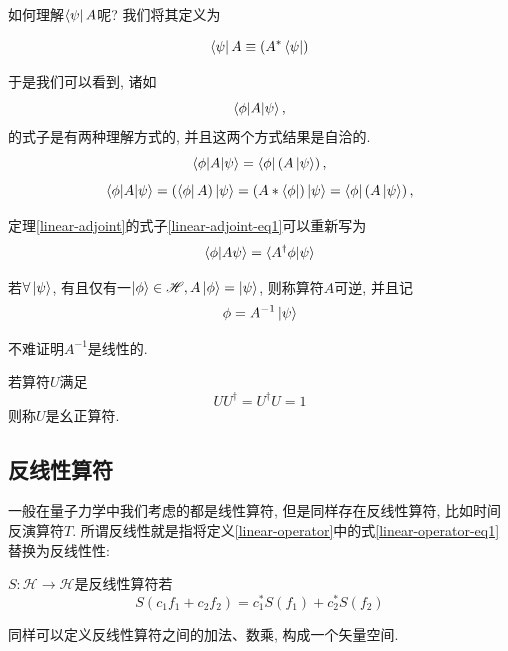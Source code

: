 如何理解$\bra\psi A$呢? 我们将其定义为
\begin{definition}
    \begin{equation}
        \bra\psi A\equiv (A^*\bra\psi)
    \end{equation}
\end{definition}

于是我们可以看到, 诸如
\begin{equation}
    \braket{\phi|A|\psi},
\end{equation}
的式子是有两种理解方式的, 并且这两个方式结果是自洽的.
\begin{equation}
    \braket{\phi|A|\psi}=\bra\phi\left(A\ket\psi\right),
\end{equation}
\begin{equation}
    \braket{\phi|A|\psi}=\left(\bra\phi A\right)\ket\psi=(A*\bra\phi)\ket\psi=\bra\phi\left(A\ket\psi\right),
\end{equation}

定理\ref{linear-adjoint}的式子\ref{linear-adjoint-eq1}可以重新写为
\begin{equation}
    \braket{\phi|A\psi}=\braket{A^\dagger\phi|\psi}
\end{equation}

\begin{definition}[算符的逆]
    若$\forall\ket\psi$, 有且仅有一$\ket\phi\in\mathscr H, A\ket\phi=\ket\psi$, 则称算符$A$可逆, 并且记
    \begin{equation}
        \phi=A^{-1}\ket\psi
    \end{equation}
\end{definition}
不难证明$A^{-1}$是线性的.

\begin{definition}[幺正算符]
    若算符$U$满足
    \begin{equation}
        UU^\dagger=U^\dagger U=1
    \end{equation}
    则称$U$是幺正算符.
\end{definition}

\subsection{反线性算符}
一般在量子力学中我们考虑的都是线性算符, 但是同样存在反线性算符, 比如时间反演算符$T$. 所谓反线性就是指将定义\ref{linear-operator}中的式\eqref{linear-operator-eq1}替换为反线性性:
\begin{definition}[反线性算符]\label{antilinear-operator}
    $S: \mathscr H\to\mathscr H$是反线性算符若
    \begin{equation}
        S(c_1f_1+c_2f_2)=c_1^*S(f_1)+c_2^*S(f_2)\label{antilinear-operator-eq1}
    \end{equation}
\end{definition}
同样可以定义反线性算符之间的加法、数乘, 构成一个矢量空间.

